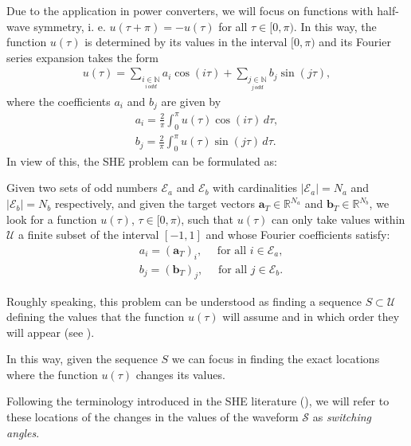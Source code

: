 Due to the application in power converters, we will focus on functions with half-wave symmetry, i. e. $u(\tau + \pi) = -u(\tau)$ for all $\tau \in [0,\pi)$. In this way, the function $u(\tau)$ is determined by its values in the interval $[0,\pi)$ and its Fourier series expansion takes the form
\begin{gather}
    u(\tau ) = \sum_{\underset{i\, odd}{i \in \mathbb{N}}} a_i \cos(i\tau)+ \sum_{\underset{j\, odd}{j \in \mathbb{N}}}  b_j \sin(j \tau), 
\end{gather}
where the coefficients $a_i$ and $b_j$ are given by
\begin{gather}
    a_i = \frac{2}{\pi} \int_0^\pi u(\tau ) \cos(i \tau)\,d\tau, \label{an}
    \\
    b_j = \frac{2}{\pi} \int_0^\pi u(\tau)  \sin(j \tau)\,d\tau. \label{bn}
\end{gather}
In view of this, the SHE problem can be formulated as:
\begin{problem}[SHE]\label{SHEp}
Given two sets of odd numbers $\mathcal{E} _a $ and $\mathcal{E} _b $ with cardinalities $|\mathcal{E}_a| = N_a $ and $ |\mathcal{E} _b| = N_b$ respectively, and given the target vectors $\bm{a}_T \in \mathbb{R}^{N_a}$ and $\bm{b}_T \in \mathbb{R}^{N_b} $, we look for a function $u(\tau)$, $\tau \in [0,\pi)$, such that $u(\tau) $ can only take values within $\mathcal{U}$ a finite subset of the interval $[-1,1]$ and whose Fourier coefficients satisfy: 
\begin{align*}
	& a_i = (\bm{a}_T)_i, \quad\textrm{ for all } i \in \mathcal{E}_a,
	\\
	& b_j = (\bm {b}_T)_j, \quad\textrm{ for all } j \in \mathcal{E}_b.
\end{align*}
\end{problem}


Roughly speaking, this problem can be understood as finding a sequence $S\subset \mathcal{U}$ defining the values that the function $u(\tau)$ will assume and in which order they will appear (see \cite{Konstantinou2010}).

In this way, given the sequence $S$ we can focus in finding the exact locations where the function $u(\tau)$ changes its values.

Following the terminology introduced in the SHE literature (\cite{Yang2015,Konstantinou2010,Sun1996}), we will refer to these locations of the changes in the values of the waveform $\mathcal{S}$ as \textit{switching angles}.

